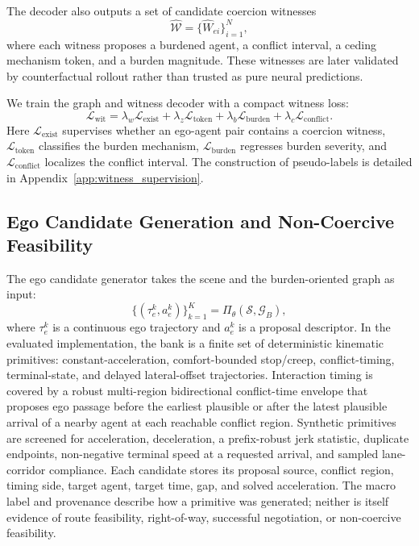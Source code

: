 \documentclass[10pt]{article}
\begin{document}
The decoder also outputs a set of candidate coercion witnesses
\begin{equation}
    \widehat{\mathcal{W}} =
    \{ \widehat{W}_{ei} \}_{i=1}^{N},
\end{equation}
where each witness proposes a burdened agent, a conflict interval, a ceding mechanism token, and a burden magnitude. These witnesses are later validated by counterfactual rollout rather than trusted as pure neural predictions.

We train the graph and witness decoder with a compact witness loss:
\begin{equation}
    \mathcal{L}_{\mathrm{wit}}
    =
    \lambda_w \mathcal{L}_{\mathrm{exist}}
    +
    \lambda_z \mathcal{L}_{\mathrm{token}}
    +
    \lambda_b \mathcal{L}_{\mathrm{burden}}
    +
    \lambda_c \mathcal{L}_{\mathrm{conflict}} .
\end{equation}
Here $\mathcal{L}_{\mathrm{exist}}$ supervises whether an ego-agent pair contains a coercion witness, $\mathcal{L}_{\mathrm{token}}$ classifies the burden mechanism, $\mathcal{L}_{\mathrm{burden}}$ regresses burden severity, and $\mathcal{L}_{\mathrm{conflict}}$ localizes the conflict interval. The construction of pseudo-labels is detailed in Appendix~\ref{app:witness_supervision}.

\subsection{Ego Candidate Generation and Non-Coercive Feasibility}
\label{sec:method_candidate}

The ego candidate generator takes the scene and the burden-oriented graph as input:
\begin{equation}
    \{(\tau^k_e, a^k_e)\}_{k=1}^{K}
    =
    \Pi_{\theta}(\mathcal{S}, \mathcal{G}_B),
\end{equation}
where $\tau^k_e$ is a continuous ego trajectory and $a^k_e$ is a proposal descriptor. In the evaluated implementation, the bank is a finite set of deterministic kinematic primitives: constant-acceleration, comfort-bounded stop/creep, conflict-timing, terminal-state, and delayed lateral-offset trajectories. Interaction timing is covered by a robust multi-region bidirectional conflict-time envelope that proposes ego passage before the earliest plausible or after the latest plausible arrival of a nearby agent at each reachable conflict region. Synthetic primitives are screened for acceleration, deceleration, a prefix-robust jerk statistic, duplicate endpoints, non-negative terminal speed at a requested arrival, and sampled lane-corridor compliance. Each candidate stores its proposal source, conflict region, timing side, target agent, target time, gap, and solved acceleration. The macro label and provenance describe how a primitive was generated; neither is itself evidence of route feasibility, right-of-way, successful negotiation, or non-coercive feasibility.
\end{document}
